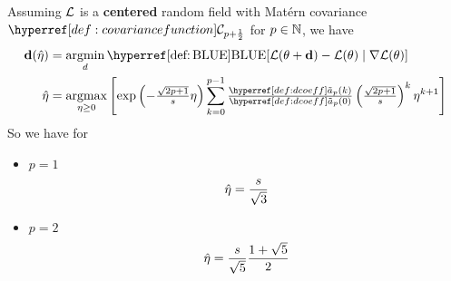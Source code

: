 \begin{theorem}
	Assuming \(\mathcal{L}\) is a \textbf{centered} random field with Matérn covariance
	\(\C_{p+\frac12}\) for \(p\in\mathbb{N}\), we have
	\begin{align*}
		\step(\hat{\lr})
		&= \argmin_{d}
		\BLUE[\Loss(\param + \step) - \Loss(\param)\mid \grad\Loss(\param)]\\
		\hat{\lr}
		&= \argmax_{\lr\ge0}\left[
			\exp\left(-\tfrac{\sqrt{2p+1}}{s}\lr\right)
			\sum_{k=0}^{p-1}\tfrac{\dcoeff(k)}{\dcoeff(0)}\left(\tfrac{\sqrt{2p+1}}{s}\right)^k \lr^{k+1}
		\right]
	\end{align*}
	So we have for
	\begin{itemize}
		\item \(p=1\)
		\begin{equation*}
			\hat{\eta} = \frac{s}{\sqrt{3}}
		\end{equation*}

		\item \(p=2\)
		\begin{equation*}
			\hat{\eta}
			= \frac{s}{\sqrt{5}}\frac{1+\sqrt{5}}2
		\end{equation*}
	\end{itemize}
\end{theorem}

